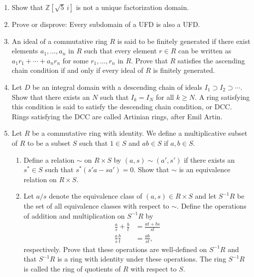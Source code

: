 {\begin{enumerate}
\item
Show that ${\mathbb Z}[\sqrt{5}\, i]$ is not a unique factorization domain.



\item
Prove or disprove:  Every subdomain of a UFD is also a UFD.


\item
An ideal of a commutative ring $R$ is said to be {\bfi finitely
generated\/} if there exist elements
$a_1, \ldots, a_n$ in $R$ such that every element $r \in R$ can be
written as $a_1 r_1 + \cdots + a_n r_n$ for some $r_1, \ldots, r_n$ in
$R$.  Prove that $R$ satisfies the ascending chain condition if and
only if every ideal of $R$ is finitely generated.  


\item
Let $D$ be an integral domain with a descending chain of ideals $I_1
\supset I_2 \supset \cdots$.  Show that there exists an $N$ such that
$I_k = I_N$ for all $k \geq N$. A ring satisfying this condition is
said to satisfy the {\bfi descending chain condition}, or {\bfi DCC}. Rings satisfying the DCC are called
{\bfi Artinian rings}, after Emil
Artin.  


\item
Let $R$ be a commutative ring with identity. We define a {\bfi
multiplicative subset\/} of $R$ to be a
subset $S$ such that $1 \in S$ and $ab \in S$ if $a, b \in S$. 
\begin{enumerate}

 \item
Define a relation $\sim$ on $R \times S$ by $(a, s) \sim (a', s')$ if
there exists an $s^\ast \in S$ such that $s^\ast(s' a -s a') =0$. Show that
$\sim$ is an equivalence relation on $R \times S$.
 
 
 \item
Let $a/s$ denote the equivalence class of $(a,s) \in R \times S$ and
let $ S^{-1}R$ be the set of all equivalence classes with respect to
$\sim$.  Define  the operations of addition and multiplication on
$S^{-1} R$ by
\begin{align*}
\frac{a}{s} + \frac{b}{t} & = \frac{at + b s}{s t} \\
\frac{a}{s}  \frac{b}{t} & = \frac{a b}{s t},
\end{align*}
respectively. Prove that these operations are well-defined on $S^{-1}R$
and that $S^{-1}R$ is a ring with identity under these operations.
The ring $S^{-1}R$ is called the {\bfi ring of
quotients\/} of $R$ with respect to $S$.



\end{enumerate}
\end{enumerate}}
